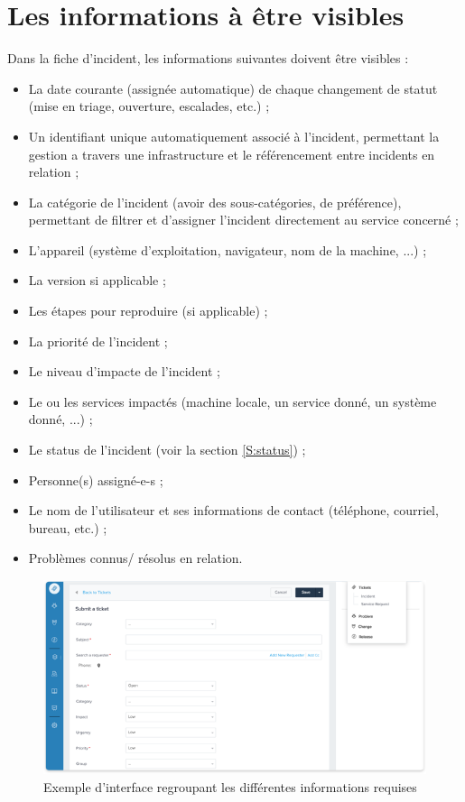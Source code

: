 \section{Les informations à être visibles}

Dans la fiche d'incident, les informations suivantes doivent être visibles :

\begin{itemize}
    \item La date courante (assignée automatique) de chaque changement de statut
        (mise en triage, ouverture, escalades, etc.) ;
    \item Un identifiant unique automatiquement associé à l'incident,
        permettant la gestion a travers une infrastructure et le référencement
        entre incidents en relation ;
    \item La catégorie de l'incident (avoir des sous-catégories, 
        de préférence), permettant de filtrer et d'assigner l'incident directement
        au service concerné ;
    \item L'appareil (système d'exploitation, navigateur, nom de la machine, ...) ;
    \item La version si applicable ;
    \item Les étapes pour reproduire (si applicable) ;
    \item La priorité de l'incident ;
    \item Le niveau d'impacte de l'incident ;
    \item Le ou les services impactés
        (machine locale, un service donné, un système donné, ...) ;
    \item Le status de l'incident (voir la section \ref{S:status}) ;
    \item Personne(s) assigné-e-s ;
    \item Le nom de l'utilisateur et ses informations de contact
        (téléphone, courriel, bureau, etc.) ;
    \item Problèmes connus/ résolus en relation.
\end{itemize}

\begin{figure}[H]
    \centering
    \includegraphics[width=.864\linewidth]
    {assets/empower-employees-with-self-service-5a1a79af.png}
    \caption{Exemple d'interface regroupant les différentes informations requises}
\end{figure}
